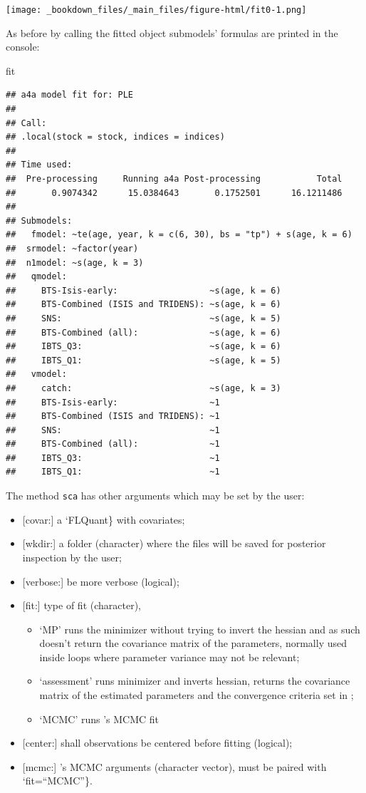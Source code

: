 \documentclass[
]{book}
\newenvironment{Shaded}{\begin{snugshade}}{\end{snugshade}}
\newcommand{\NormalTok}[1]{#1}
\providecommand{\tightlist}{%
  \setlength{\itemsep}{0pt}\setlength{\parskip}{0pt}}
\begin{document}
\texttt{[image: \_bookdown\_files/\_main\_files/figure-html/fit0-1.png]}

As before by calling the fitted object submodels' formulas are printed in the console:

\begin{Shaded}
\begin{Highlighting}[]
\NormalTok{fit}
\end{Highlighting}
\end{Shaded}

\begin{verbatim}
## a4a model fit for: PLE 
## 
## Call:
## .local(stock = stock, indices = indices)
## 
## Time used:
##  Pre-processing     Running a4a Post-processing           Total 
##       0.9074342      15.0384643       0.1752501      16.1211486 
## 
## Submodels:
##   fmodel: ~te(age, year, k = c(6, 30), bs = "tp") + s(age, k = 6)
##  srmodel: ~factor(year)
##  n1model: ~s(age, k = 3)
##   qmodel:
##     BTS-Isis-early:                  ~s(age, k = 6)
##     BTS-Combined (ISIS and TRIDENS): ~s(age, k = 6)
##     SNS:                             ~s(age, k = 5)
##     BTS-Combined (all):              ~s(age, k = 6)
##     IBTS_Q3:                         ~s(age, k = 6)
##     IBTS_Q1:                         ~s(age, k = 5)
##   vmodel:
##     catch:                           ~s(age, k = 3)
##     BTS-Isis-early:                  ~1
##     BTS-Combined (ISIS and TRIDENS): ~1
##     SNS:                             ~1
##     BTS-Combined (all):              ~1
##     IBTS_Q3:                         ~1
##     IBTS_Q1:                         ~1
\end{verbatim}

The method \texttt{sca} has other arguments which may be set by the user:

\begin{itemize}
\tightlist
\item
  {[}covar:{]} a `FLQuant\} with covariates;
\item
  {[}wkdir:{]} a folder (character) where the \ADMB files will be saved for posterior inspection by the user;
\item
  {[}verbose:{]} be more verbose (logical);
\item
  {[}fit:{]} type of fit (character),

  \begin{itemize}
  \tightlist
  \item
    `MP' runs the minimizer without trying to invert the hessian and as such doesn't return the covariance matrix of the parameters, normally used inside \MSE loops where parameter variance may not be relevant;
  \item
    `assessment' runs minimizer and inverts hessian, returns the covariance matrix of the estimated parameters and the convergence criteria set in \ADMB;
  \item
    `MCMC' runs \ADMB's MCMC fit
  \end{itemize}
\item
  {[}center:{]} shall observations be centered before fitting (logical);
\item
  {[}mcmc:{]} \ADMB's MCMC arguments (character vector), must be paired with `fit=``MCMC''\}.
\end{itemize}
\end{document}
